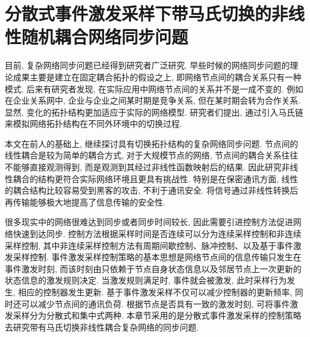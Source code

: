 \chapter{分散式事件激发采样下带马氏切换的非线性随机耦合网络同步问题}\label{chapternonline}
    目前, 复杂网络同步问题已经得到研究者广泛研究. 早些时候的网络同步问题的理论成果主要是建立在固定耦合拓扑的假设之上, 即网络节点间的耦合关系只有一种模式. 后来有研究者发现, 在实际应用中网络节点间的关系并不是一成不变的. 例如在企业关系网中, 企业与企业之间某时期是竞争关系, 但在某时期会转为合作关系. 显然, 变化的拓扑结构更加适应于实际的网络模型. 研究者们提出, 通过引入马氏链来模拟网络拓扑结构在不同外环境中的切换过程.

    本文在前人的基础上, 继续探讨具有切换拓扑结构的复杂网络同步问题.
    节点间的线性耦合是较为简单的耦合方式, 对于大规模节点的网络, 节点间的耦合关系往往不能够直接观测得到, 而是观测到其经过非线性函数映射后的结果. 因此研究非线性耦合的结构更符合实际网络环境且更具有挑战性. 特别是在保密通讯方面, 线性的耦合结构比较容易受到黑客的攻击, 不利于通讯安全. 将信号通过非线性转换后再传输能够极大地提高了信息传输的安全性.

    很多现实中的网络很难达到同步或者同步时间较长, 因此需要引进控制方法促进网络快速到达同步. 控制方法根据采样时间是否连续可以分为连续采样控制和非连续采样控制, 其中非连续采样控制方法有周期间歇控制、脉冲控制、以及基于事件激发采样控制. 事件激发采样控制策略的基本思想是网络节点间的信息传输只发生在事件激发时刻, 而该时刻由只依赖于节点自身状态信息以及邻居节点上一次更新的状态信息的激发规则决定. 当激发规则满足时, 事件就会被激发, 此时采样行为发生, 相应的控制器发生更新. 基于事件激发采样不仅可以减少控制器的更新频率, 同时还可以减少节点间的通讯负荷. 根据节点是否具有一致的激发时刻, 可将事件激发采样分为分散式和集中式两种. 本章节采用的是分散式事件激发采样的控制策略去研究带有马氏切换非线性耦合复杂网络的同步问题.

